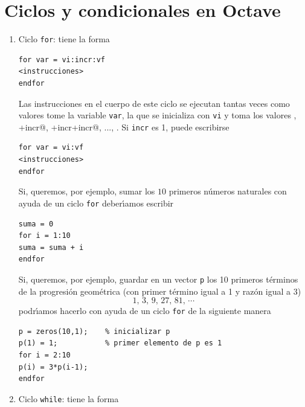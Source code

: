 \documentclass[letter,11pt]{article}
\newcommand\0{\mathbf{0}}
\newcommand{\octave}{{\sc Octave }}
\begin{document}
 \section{Ciclos y condicionales en \octave}

\begin{enumerate}
\item Ciclo \Verb+for+: tiene la forma

\medskip

\begin{lstlisting}		
for var = vi:incr:vf
<instrucciones>
endfor
\end{lstlisting}

\medskip

\noindent Las instrucciones en el cuerpo de este ciclo se ejecutan
tantas veces como valores tome la variable \Verb+var+, la que
se inicializa con \Verb+vi+ y toma los valores
\Verb@vi@, \Verb@vi+incr@, \Verb@vi+incr+incr@, ..., \Verb@vf@.
Si \Verb+incr+ es 1, puede escribirse

\medskip

\begin{lstlisting}		
for var = vi:vf
<instrucciones>
endfor
\end{lstlisting}

\medskip

\noindent Si, queremos, por ejemplo, sumar los $10$ primeros n\'umeros
naturales con ayuda de un ciclo \Verb+for+ deber\'{\i}amos
escribir

\medskip

\begin{lstlisting}
suma = 0
for i = 1:10
suma = suma + i
endfor
\end{lstlisting}

\medskip

\noindent Si, queremos, por ejemplo, guardar en un vector \verb+p+ los
10 primeros t\'erminos de la progresi\'on geom\'etrica (con primer t\'ermino
igual a 1 y raz\'on igual a 3)
\[
1,\,3,\,9,\,27,\,81,\,\cdots
\]
podr\'{\i}amos hacerlo con ayuda de un ciclo \verb+for+ de la siguiente manera

\medskip

\begin{lstlisting}
p = zeros(10,1);    % inicializar p
p(1) = 1;           % primer elemento de p es 1
for i = 2:10
p(i) = 3*p(i-1);
endfor
\end{lstlisting}

\medskip

\item Ciclo \Verb+while+: tiene la forma


\end{enumerate}
\end{document}
